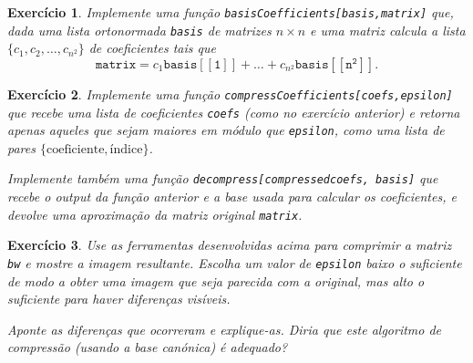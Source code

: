 \documentclass{article}
\newtheorem{ex}{Exercício}[section]
\begin{document}
\begin{ex}
Implemente uma função \texttt{basisCoefficients[basis,matrix]} que, dada uma lista \emph{ortonormada} \texttt{basis} de matrizes $n \times n$ e uma matriz calcula a lista $\{c_1, c_2, \dots, c_{n^2}\}$ de coeficientes tais que
\[\mathtt{matrix} = c_1 \mathtt{basis[[1]]} + \dots + c_{n^2} \mathtt{basis[[n^2]]}.\]
\end{ex}

\begin{ex}
Implemente uma função \texttt{compressCoefficients[coefs,epsilon]} que recebe uma lista de coeficientes \texttt{coefs} (como no exercício anterior) e retorna apenas aqueles que sejam maiores em módulo que \texttt{epsilon}, como uma lista de pares $\{\text{coeficiente}, \text{índice}\}$.

Implemente também uma função \texttt{decompress[compressedcoefs, basis]} que recebe o output da função anterior e a base usada para calcular os coeficientes, e devolve uma aproximação da matriz original \texttt{matrix}.
\end{ex}

\begin{ex}\label{excomprimir}
Use as ferramentas desenvolvidas acima para comprimir a matriz \texttt{bw} e mostre a imagem resultante. Escolha um valor de \texttt{epsilon} baixo o suficiente de modo a obter uma imagem que seja parecida com a original, mas alto o suficiente para haver diferenças visíveis.

Aponte as diferenças que ocorreram e explique-as. Diria que este algoritmo de compressão (usando a base canónica) é adequado?
\end{ex}
\end{document}
